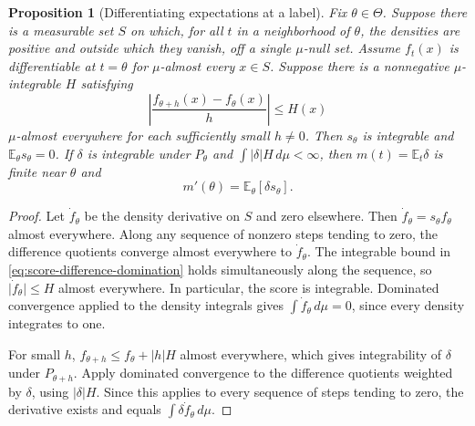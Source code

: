 \documentclass[11pt,oneside]{book}
\newtheorem{proposition}[theorem]{Proposition}
\theoremstyle{definition}
\theoremstyle{remark}
\begin{document}
\begin{proposition}[Differentiating expectations at a label]
\label{prop:score-differentiate-expectation}
Fix $\theta\in\Theta$. Suppose there is a measurable set $S$
on which, for all $t$ in a neighborhood of $\theta$, the densities
are positive and outside which they vanish, off a single
$\mu$-null set. Assume $f_t(x)$ is differentiable
at $t=\theta$ for $\mu$-almost every $x\in S$. Suppose there is a
nonnegative $\mu$-integrable $H$ satisfying
\begin{equation}
\left|\frac{f_{\theta+h}(x)-f_\theta(x)}{h}\right|
\leq H(x)
\label{eq:score-difference-domination}
\end{equation}
$\mu$-almost everywhere for each sufficiently small $h\ne0$.
Then $s_\theta$ is integrable and $\mathbb E_\theta s_\theta=0$.
If $\delta$ is integrable under $P_\theta$ and
$\int|\delta|H\,d\mu<\infty$, then $m(t)=\mathbb E_t\delta$
is finite near $\theta$ and
\[
m'(\theta)=\mathbb E_\theta[\delta s_\theta].
\]
\end{proposition}
\begin{proof}
Let $\dot f_\theta$ be the density derivative on $S$ and zero
elsewhere. Then $\dot f_\theta=s_\theta f_\theta$ almost
everywhere. Along any sequence of nonzero steps tending to zero,
the difference quotients converge almost everywhere to
$\dot f_\theta$. The integrable bound in
\eqref{eq:score-difference-domination} holds simultaneously
along the sequence, so $\lvert\dot f_\theta\rvert\leq H$
almost everywhere. In particular, the score is integrable.
Dominated convergence applied to the density integrals gives
$\int\dot f_\theta\,d\mu=0$, since every density integrates to one.

For small $h$, $f_{\theta+h}\leq f_\theta+|h|H$ almost everywhere,
which gives integrability of $\delta$ under $P_{\theta+h}$.
Apply dominated convergence to the difference quotients weighted
by $\delta$, using $|\delta|H$. Since this applies to every
sequence of steps tending to zero, the derivative exists and
equals $\int\delta\dot f_\theta\,d\mu$.
\end{proof}
\end{document}
